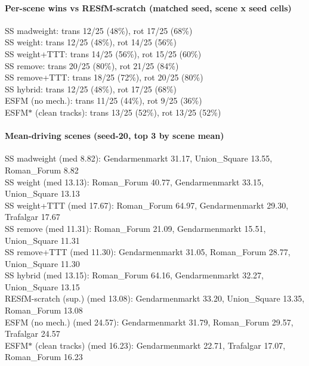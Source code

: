 \documentclass[10pt]{article}
\begin{document}
\paragraph{Per-scene wins vs RESfM-scratch (matched seed, scene x seed cells)}
\indent SS madweight: trans 12/25 (48\%), rot 17/25 (68\%)\\
\indent SS weight: trans 12/25 (48\%), rot 14/25 (56\%)\\
\indent SS weight+TTT: trans 14/25 (56\%), rot 15/25 (60\%)\\
\indent SS remove: trans 20/25 (80\%), rot 21/25 (84\%)\\
\indent SS remove+TTT: trans 18/25 (72\%), rot 20/25 (80\%)\\
\indent SS hybrid: trans 12/25 (48\%), rot 17/25 (68\%)\\
\indent ESFM (no mech.): trans 11/25 (44\%), rot 9/25 (36\%)\\
\indent ESFM$\ast$ (clean tracks): trans 13/25 (52\%), rot 13/25 (52\%)\\
\paragraph{Mean-driving scenes (seed-20, top 3 by scene mean)}
\indent SS madweight (med 8.82): Gendarmenmarkt 31.17, Union\_Square 13.55, Roman\_Forum 8.82\\
\indent SS weight (med 13.13): Roman\_Forum 40.77, Gendarmenmarkt 33.15, Union\_Square 13.13\\
\indent SS weight+TTT (med 17.67): Roman\_Forum 64.97, Gendarmenmarkt 29.30, Trafalgar 17.67\\
\indent SS remove (med 11.31): Roman\_Forum 21.09, Gendarmenmarkt 15.51, Union\_Square 11.31\\
\indent SS remove+TTT (med 11.30): Gendarmenmarkt 31.05, Roman\_Forum 28.77, Union\_Square 11.30\\
\indent SS hybrid (med 13.15): Roman\_Forum 64.16, Gendarmenmarkt 32.27, Union\_Square 13.15\\
\indent RESfM-scratch (sup.) (med 13.08): Gendarmenmarkt 33.20, Union\_Square 13.35, Roman\_Forum 13.08\\
\indent ESFM (no mech.) (med 24.57): Gendarmenmarkt 31.79, Roman\_Forum 29.57, Trafalgar 24.57\\
\indent ESFM$\ast$ (clean tracks) (med 16.23): Gendarmenmarkt 22.71, Trafalgar 17.07, Roman\_Forum 16.23\\
\end{document}
